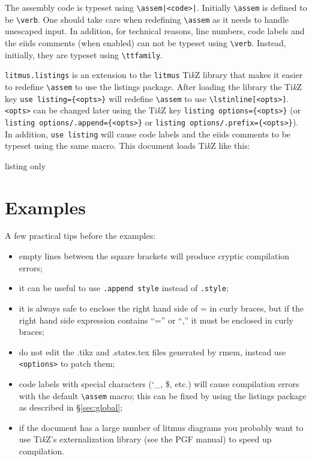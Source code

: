 \documentclass[a4paper]{article}
\newcommand{\TikZ}{Ti\textit{k}Z}
\begin{document}
The assembly code is typeset using \lstinline+\assem|<code>|+.
Initially \lstinline+\assem+ is defined to be \lstinline+\verb+.
One should take care when redefining \lstinline+\assem+ as it needs
to handle unescaped input. In addition, for technical reasons, line
numbers, code labels and the eiids comments (when enabled) can not be
typeset using \lstinline+\verb+. Instead, initially, they are typeset
using \lstinline+\ttfamily+.

\verb|litmus.listings| is an extension to the \verb|litmus| \TikZ{} library
that makes it easier to redefine \lstinline+\assem+ to use the listings package.
After loading the library the \TikZ{} key \lstinline+use listing={<opts>}+
will redefine \lstinline+\assem+ to use \lstinline+\lstinline[<opts>]+.
\lstinline+<opts>+ can be changed later using the \TikZ{} key \lstinline+listing options={<opts>}+ (or \lstinline+listing options/.append={<opts>}+ or \lstinline+listing options/.prefix={<opts>}+).
In addition, \lstinline+use listing+ will cause code labels
and the eiids comments to be typeset using the same macro. This document
loads \TikZ{} like this:
\begin{tcblisting}{listing only}
\usepackage{tikz}
\usetikzlibrary{litmus, litmus.listings}
\end{tcblisting}


\section{Examples}\label{sec:examples}

A few practical tips before the examples:
\begin{itemize}\itemsep0ex
  \item empty lines between the square brackets will produce cryptic compilation errors;
  \item it can be useful to use \lstinline|.append style| instead of \lstinline|.style|;
  \item it is always safe to enclose the right hand side of = in curly braces,
  but if the right hand side expression contains ``='' or ``,'' it must be enclosed in curly braces;
  \item do not edit the .tikz and .states.tex files generated by rmem, instead
  use \lstinline|<options>| to patch them;
  \item code labels with special characters (\char`_, \$, etc.) will cause compilation
  errors with the default \lstinline|\assem| macro; this can be fixed by using the
  listings package as described in \S\ref{sec:global};
  \item if the document has a large number of litmus diagrams you probably
  want to use \TikZ{}'s externalization library (see the PGF manual) to
  speed up compilation.
\end{itemize}
\end{document}
